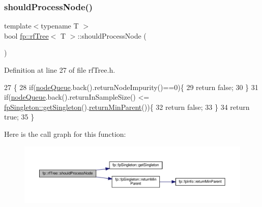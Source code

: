 \subsubsection{\texorpdfstring{should\+Process\+Node()}{shouldProcessNode()}\hspace{0.1cm}{\footnotesize\ttfamily [1/2]}}
{\footnotesize\ttfamily template$<$typename T $>$ \\
bool \hyperlink{classfp_1_1rfTree}{fp\+::rf\+Tree}$<$ T $>$\+::should\+Process\+Node (\begin{DoxyParamCaption}{ }\end{DoxyParamCaption})\hspace{0.3cm}{\ttfamily [inline]}}



Definition at line 27 of file rf\+Tree.\+h.


\begin{DoxyCode}
27                                                \{
28                     \textcolor{keywordflow}{if}(\hyperlink{classfp_1_1rfTree_af72d0a2f930fd480dfb4858885c2df23}{nodeQueue}.back().returnNodeImpurity()==0)\{
29                         \textcolor{keywordflow}{return} \textcolor{keyword}{false};
30                     \}
31                     \textcolor{keywordflow}{if}(\hyperlink{classfp_1_1rfTree_af72d0a2f930fd480dfb4858885c2df23}{nodeQueue}.back().returnInSampleSize() <= 
      \hyperlink{classfp_1_1fpSingleton_a8bdae77b68521003e3fc630edec2e240}{fpSingleton::getSingleton}().\hyperlink{classfp_1_1fpSingleton_a2d06406b6462099e0adb393218090420}{returnMinParent}())\{
32                         \textcolor{keywordflow}{return} \textcolor{keyword}{false};
33                     \}
34                     \textcolor{keywordflow}{return} \textcolor{keyword}{true};
35                 \}
\end{DoxyCode}
Here is the call graph for this function\+:
\nopagebreak
\begin{figure}[H]
\begin{center}
\leavevmode
\includegraphics[width=350pt]{classfp_1_1rfTree_a36abf82d31ca57670b09da16525dce0d_cgraph}
\end{center}
\end{figure}
\mbox{\label{classfp_1_1rfTree_a36abf82d31ca57670b09da16525dce0d}} 
